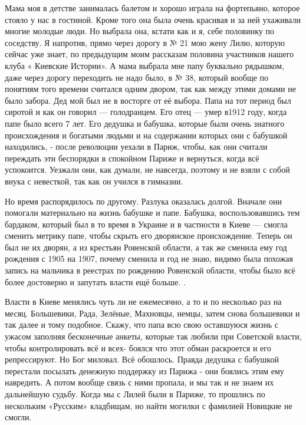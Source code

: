 Мама моя в детстве занималась балетом и
хорошо играла на фортепьяно, которое стояло у нас в гостиной. Кроме того она
была очень красивая и за ней ухаживали многие молодые люди. Но выбрала она,
кстати  как и я,  себе половинку по соседству. Я напротив, прямо через
дорогу в № 21 мою жену Лилю, которую сейчас  уже знает, по предыдущим моим
рассказам   половина участников нашего клуба « Киевские Истории».  А мама
выбрала мне папу буквально  рядышком, даже через дорогу переходить не надо
было, в № 38, который вообще по понятиям того времени считался одним двором,
так как между этими домами не было забора. Дед мой был не в восторге от её
выбора. Папа на тот период был сиротой и как он говорил — голодранцем. Его
отец — умер в1912 году, когда папе было всего 7 лет. Его дедушка и бабушка,
которые были очень знатного происхождения и богатыми людьми и на содержании
которых они с бабушкой находились, - после революции уехали в Париж, чтобы,
как они считали  переждать эти беспорядки в спокойном Париже и вернуться,
когда всё успокоится. Уезжали они, как думали, не навсегда, поэтому и не
взяли с собой внука с невесткой, так как он учился в гимназии. 

Но время
распорядилось по другому. Разлука оказалась долгой. Вначале они помогали
материально на жизнь бабушке и папе. Бабушка, воспользовавшись тем бардаком,
который был в то время в  Украине и в частности в Киеве — смогла сменить
метрику папе, чтобы скрыть его дворянское происхождение. Теперь он был не их
дворян, а из крестьян Ровенской области, а так же сменила ему год рождения с
1905 на 1907, почему сменила  и год не знаю, видимо была похожая запись на
мальчика в реестрах по рождению Ровенской области, чтобы было всё более
достоверно и запутать власти ещё больше. . 

Власти в Киеве менялись чуть ли не ежемесячно, а то и по несколько раз на
месяц. Большевики, Рада, Зелёные, Махновцы, немцы, затем снова большевики и так
далее и тому подобное.  Скажу, что папа всю свою оставшуюся жизнь с ужасом
заполняя бесконечные анкеты, которые так любили при Советской власти, чтобы
контролировать всё и всех-  боялся что этот обман раскроется и его
репрессируют.  Но Бог миловал.  Всё обошлось. Правда дедушка с бабушкой
перестали посылать денежную поддержку из Парижа - они боялись этим ему
навредить. А потом вообще связь с ними пропала, и мы так и не знаем их
дальнейшую судьбу. Когда мы с Лилей были в Париже, то прошлись по нескольким
«Русским» кладбищам, но найти могилки с фамилией Новицкие не смогли.  

